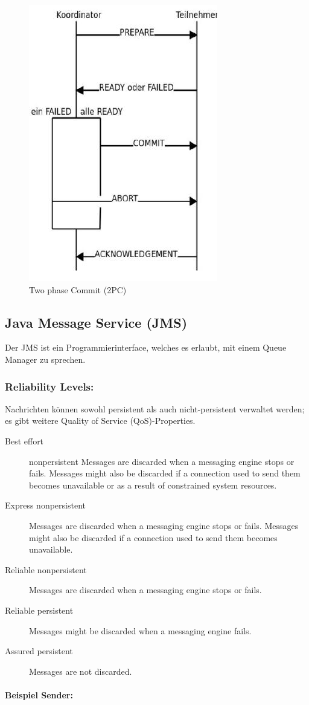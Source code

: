 \begin{figure}[h]
	\centering
	\includegraphics[width=0.3\linewidth]{img/two_phase_commit}
	\caption{Two phase Commit (2PC)}
	\label{fig:twophasecommit}
\end{figure}

\subsection{Java Message Service (JMS)}
Der JMS ist ein Programmierinterface, welches es erlaubt, mit einem Queue Manager zu sprechen.

\subsubsection{Reliability Levels:}
Nachrichten können sowohl persistent als auch nicht-persistent verwaltet werden; es gibt weitere Quality of Service (QoS)-Properties.
\begin{description}
\item[Best effort]	nonpersistent Messages are discarded when a messaging engine stops or fails. Messages might also be discarded if a connection used to send them becomes unavailable or as a result of constrained system resources. \item[Express nonpersistent]	Messages are discarded when a messaging engine stops or fails. Messages might also be discarded if a connection used to send them becomes unavailable.
\item[Reliable nonpersistent]	Messages are discarded when a messaging engine stops or fails.
\item[Reliable persistent]	Messages might be discarded when a messaging engine fails.
\item[Assured persistent]	Messages are not discarded.
\end{description}

\paragraph{Beispiel Sender:} \hfill \\

